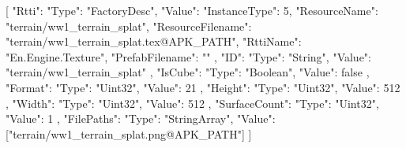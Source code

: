 [{
        "Rtti": {
            "Type": "FactoryDesc",
            "Value": {
                "InstanceType": 5,
                "ResourceName": "terrain/ww1_terrain_splat",
                "ResourceFilename": "terrain/ww1_terrain_splat.tex@APK_PATH",
                "RttiName": "En.Engine.Texture",
                "PrefabFilename": ""
            }
        },
        "ID": {
            "Type": "String",
            "Value": "terrain/ww1_terrain_splat"
        },
        "IsCube": {
            "Type": "Boolean",
            "Value": false
        },
        "Format": {
            "Type": "Uint32",
            "Value": 21
        },
        "Height": {
            "Type": "Uint32",
            "Value": 512
        },
        "Width": {
            "Type": "Uint32",
            "Value": 512
        },
        "SurfaceCount": {
            "Type": "Uint32",
            "Value": 1
        },
        "FilePaths": {
            "Type": "StringArray",
            "Value": ["terrain/ww1_terrain_splat.png@APK_PATH"]
        }
    }]